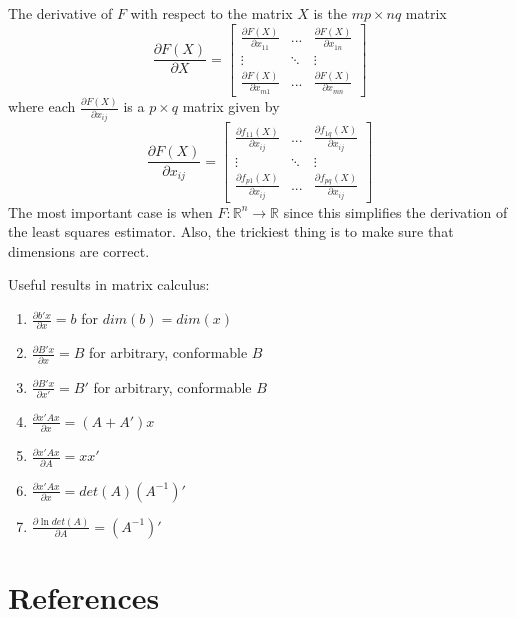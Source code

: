 \documentclass[12pt,]{book}
\providecommand{\tightlist}{%
  \setlength{\itemsep}{0pt}\setlength{\parskip}{0pt}}
\begin{document}
The derivative of \(F\) with respect to the matrix \(X\) is the \(mp \times nq\) matrix
\[
    \frac{\partial F(X)}{\partial X} = \begin{bmatrix}
    \frac{\partial F(X)}{\partial x_ {11}} & ... & \frac{\partial F(X)}{\partial x_ {1n}} \\ \vdots & \ddots & \vdots \\
    \frac{\partial F(X)}{\partial x_ {m1}} & ... & \frac{\partial F(X)}{\partial x_ {mn}}
    \end{bmatrix}
\]
where each \(\frac{\partial F(X)}{\partial x_ {ij}}\) is a \(p\times q\) matrix given by\\
\[
    \frac{\partial F(X)}{\partial x_ {ij}} = \begin{bmatrix}
    \frac{\partial f_ {11}(X)}{\partial x_ {ij}} & ... & \frac{\partial f_ {1q}(X)}{\partial x_ {ij}} \\
    \vdots & \ddots & \vdots \\
    \frac{\partial f_ {p1}(X)}{\partial x_ {ij}} & ... & \frac{\partial f_ {pq}(X)}{\partial x_ {ij}}
    \end{bmatrix}
\]
The most important case is when \(F: \mathbb R^n \rightarrow \mathbb R\) since this simplifies the derivation of the least squares estimator. Also, the trickiest thing is to make sure that dimensions are correct.

Useful results in matrix calculus:

\begin{enumerate}
\def\labelenumi{\arabic{enumi}.}
\tightlist
\item
  \(\frac{\partial b'x}{\partial x}= b\) for \(dim(b) = dim(x)\)
\item
  \(\frac{\partial B'x}{\partial x}= B\) for arbitrary, conformable \(B\)
\item
  \(\frac{\partial B'x}{\partial x'}= B'\) for arbitrary, conformable \(B\)
\item
  \(\frac{\partial x'Ax}{\partial x} = (A + A')x\)
\item
  \(\frac{\partial x'Ax}{\partial A} = xx'\)
\item
  \(\frac{\partial x'Ax}{\partial x} = det(A) (A^{-1})'\)
\item
  \(\frac{\partial \ln det(A)}{\partial A} = (A^{-1})'\)
\end{enumerate}

\hypertarget{references-1}{%
\section{References}\label{references-1}}
\end{document}
